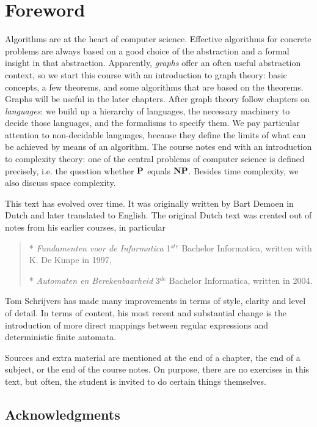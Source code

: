 \chapter*{Foreword}

Algorithms are at the heart of computer science. Effective algorithms
for concrete problems are always based on a good choice of the
abstraction and a formal insight in that abstraction. Apparently, {\em
graphs} offer an often useful abstraction context, so we start this
course with an introduction to graph theory: basic concepts, a few
theorems, and some algorithms that are based on the theorems. Graphs
will be useful in the later chapters. After graph theory follow
chapters on {\em languages}: we build up a hierarchy of languages,
the necessary machinery to decide those languages, and the formalisms
to specify them. We pay particular attention to non-decidable
languages, because they define the limits of what can be achieved by
means of an algorithm. The course notes end with an introduction to
complexity theory: one of the central problems of computer science is
defined precisely, i.e. the question whether $\P$ equals
$\NP$. Besides time complexity, we also discuss space complexity.


This text has evolved over time. It was originally written by Bart Demoen in
Dutch and later translated to English. The original Dutch text was created out
of notes from his earlier courses, in particular
\begin{verse}
* {\em Fundamenten voor de Informatica} 1$^{ste}$ Bachelor
Informatica, written with K. De Kimpe in 1997,

* {\em Automaten en Berekenbaarheid} 3$^{de}$ Bachelor Informatica,
written in 2004.
\end{verse}
Tom Schrijvers has made many improvements in terms of style, clarity and level
of detail. In terms of content, his most recent and substantial change is the
introduction of more direct mappings between regular expressions and
deterministic finite automata.

Sources and extra material are mentioned at the end of a chapter, the
end of a subject, or the end of the course notes. On purpose, there
are no exercises in this text, but often, the student is invited to
do certain things themselves.

\section*{Acknowledgments}

